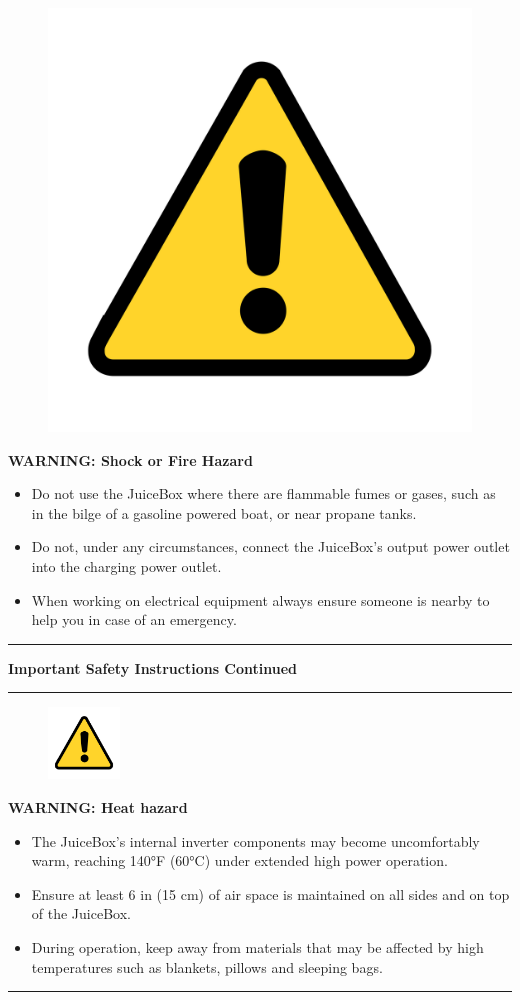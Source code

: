 \documentclass[10pt]{article}
\begin{document}
\begin{figure}
    \includegraphics[width=.75in]{warning_y}
\end{figure}

\vspace{5mm}
\noindent   
\Large{\textbf{WARNING: Shock or Fire Hazard}} \\
\begin{large}                   
	\begin{itemize}
		\item{Do not use the JuiceBox where there are flammable fumes or gases, such as
			 in the bilge of a gasoline powered boat, or near propane tanks.}	
		\item{Do not, under any circumstances, connect the JuiceBox's output power outlet into the charging power outlet.}
		\item{When working on electrical equipment always ensure someone is nearby to
			 help you in case of an emergency.}
	\end{itemize}
\end{large}
\hrule

\newpage
\begin{flushleft} {\huge \textbf{Important Safety Instructions Continued} \par}
\end{flushleft}
\hrule

\begin{figure}
    \includegraphics[width=0.75in]{warning_y}
\end{figure}

\vspace{5mm}
\noindent
\Large{\textbf{WARNING: Heat hazard}} \\
\begin{large}                                        
	\begin{itemize}
		\item{ The JuiceBox's internal inverter components may become uncomfortably warm,
			reaching 140°F (60°C) under extended high power operation.}
		\item{Ensure at least 6 in (15 cm) of air space is maintained on all sides and on top of the JuiceBox.}
		\item{During operation, keep away from materials that may be affected by high
			temperatures such as blankets, pillows and sleeping bags.}
	\end{itemize}
\end{large}
\hrule
\end{document}
